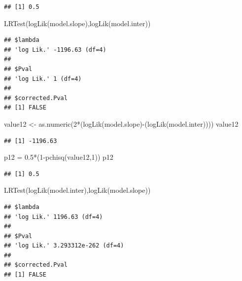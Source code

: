 \documentclass[
]{article}
\newenvironment{Shaded}{\begin{snugshade}}{\end{snugshade}}
\newcommand{\DecValTok}[1]{\textcolor[rgb]{0.00,0.00,0.81}{#1}}
\newcommand{\FloatTok}[1]{\textcolor[rgb]{0.00,0.00,0.81}{#1}}
\newcommand{\FunctionTok}[1]{\textcolor[rgb]{0.00,0.00,0.00}{#1}}
\newcommand{\NormalTok}[1]{#1}
\newcommand{\OtherTok}[1]{\textcolor[rgb]{0.56,0.35,0.01}{#1}}
\newcommand{\SpecialCharTok}[1]{\textcolor[rgb]{0.00,0.00,0.00}{#1}}
\begin{document}
\begin{verbatim}
## [1] 0.5
\end{verbatim}

\begin{Shaded}
\begin{Highlighting}[]
\FunctionTok{LRTest}\NormalTok{(}\FunctionTok{logLik}\NormalTok{(model.slope),}\FunctionTok{logLik}\NormalTok{(model.inter))}
\end{Highlighting}
\end{Shaded}

\begin{verbatim}
## $lambda
## 'log Lik.' -1196.63 (df=4)
## 
## $Pval
## 'log Lik.' 1 (df=4)
## 
## $corrected.Pval
## [1] FALSE
\end{verbatim}

\begin{Shaded}
\begin{Highlighting}[]
\NormalTok{value12 }\OtherTok{\textless{}{-}} \FunctionTok{as.numeric}\NormalTok{(}\DecValTok{2}\SpecialCharTok{*}\NormalTok{(}\FunctionTok{logLik}\NormalTok{(model.slope)}\SpecialCharTok{{-}}\NormalTok{(}\FunctionTok{logLik}\NormalTok{(model.inter))))}
\NormalTok{value12}
\end{Highlighting}
\end{Shaded}

\begin{verbatim}
## [1] -1196.63
\end{verbatim}

\begin{Shaded}
\begin{Highlighting}[]
\NormalTok{p12 }\OtherTok{=} \FloatTok{0.5}\SpecialCharTok{*}\NormalTok{(}\DecValTok{1}\SpecialCharTok{{-}}\FunctionTok{pchisq}\NormalTok{(value12,}\DecValTok{1}\NormalTok{))}
\NormalTok{p12}
\end{Highlighting}
\end{Shaded}

\begin{verbatim}
## [1] 0.5
\end{verbatim}

\begin{Shaded}
\begin{Highlighting}[]
\FunctionTok{LRTest}\NormalTok{(}\FunctionTok{logLik}\NormalTok{(model.inter),}\FunctionTok{logLik}\NormalTok{(model.slope))}
\end{Highlighting}
\end{Shaded}

\begin{verbatim}
## $lambda
## 'log Lik.' 1196.63 (df=4)
## 
## $Pval
## 'log Lik.' 3.293312e-262 (df=4)
## 
## $corrected.Pval
## [1] FALSE
\end{verbatim}
\end{document}
